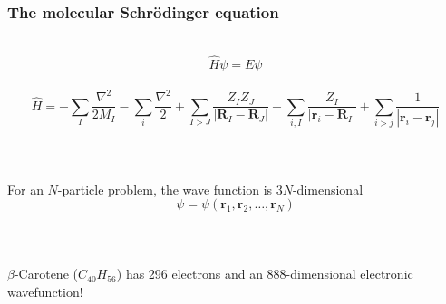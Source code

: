 \documentclass[mathserif, 8pt]{beamer}
\begin{document}
\begin{frame}
    \frametitle{The molecular Schr\"{o}dinger equation}
    \ \\
    \begin{equation}
	\nonumber
	\hat{H}\psi = E\psi
    \end{equation}
    \ \\
    \begin{equation}
	\nonumber
	\hat{H} =   -\sum_I \frac{\nabla^2}{2M_I} - \sum_i \frac{\nabla^2}{2}
		    +\sum_{I>J} \frac{Z_IZ_J}{|\boldsymbol{R}_I-\boldsymbol{R}_J|} 
		    -\sum_{i,I} \frac{Z_I}{|\boldsymbol{r}_i-\boldsymbol{R}_I|} 
		    +\sum_{i>j} \frac{1}{|\boldsymbol{r}_i-\boldsymbol{r}_j|} 
    \end{equation}
    \ \\
    \ \\
    \ \\
    \centering
    For an $N$-particle problem, the wave function is $3N$-dimensional
    \begin{equation}
	\nonumber
	\psi = \psi(\boldsymbol{r}_1,\boldsymbol{r}_2,\dots,\boldsymbol{r}_N)
    \end{equation}
    \ \\
    \ \\
    \ \\
    \pause
    \centering
    $\beta$-Carotene ($C_{40}H_{56}$) has 296 electrons and an 888-dimensional
    electronic wavefunction!
\end{frame}
\end{document}
